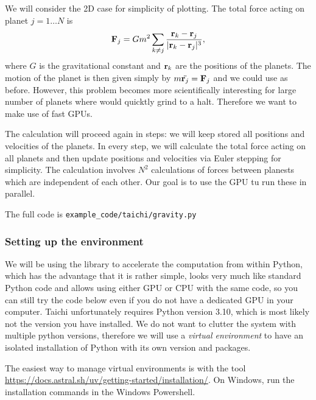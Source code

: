 We will consider the 2D case for simplicity of plotting. The total force acting on planet $j = 1\dots N$ is
\begin{equation}
    \mathbf{F}_j = Gm^2\sum_{k\neq j}\frac{\mathbf{r}_k - \mathbf{r}_j}{|\mathbf{r}_k - \mathbf{r}_j|^3},
\end{equation}
where $G$ is the gravitational constant and $\mathbf{r}_k$ are the positions of the planets. The motion of the planet is then given simply by $m\ddot{\mathbf{r}_j} = \mathbf{F}_j$ and we could use  as before. However, this problem becomes more scientifically interesting for large number of planets where  would quicktly grind to a halt. Therefore we want to make use of fast GPUs.

The calculation will proceed again in steps: we will keep stored all positions and velocities of the planets. In every step, we will calculate the total force acting on all planets and then update positions and velocities via Euler stepping for simplicity. The calculation involves $N^2$ calculations of forces between planests which are independent of each other. Our goal is to use the GPU tu run these in parallel.

The full code is \verb|example_code/taichi/gravity.py|

\subsubsection{Setting up the environment}
We will be using the  library to accelerate the computation from within Python, which has the advantage that it is rather simple, looks very much like standard Python code and allows using either GPU or CPU with the same code, so you can still try the code below even if you do not have a dedicated GPU in your computer. Taichi unfortunately requires Python version 3.10, which is most likely not the version you have installed. We do not want to clutter the system with multiple python versions, therefore we will use a \emph{virtual environment} to have an isolated installation of Python with its own version and packages.

The easiest way to manage virtual environments is with the  tool \url{https://docs.astral.sh/uv/getting-started/installation/}. On Windows, run the installation commands in the Windows Powershell.

